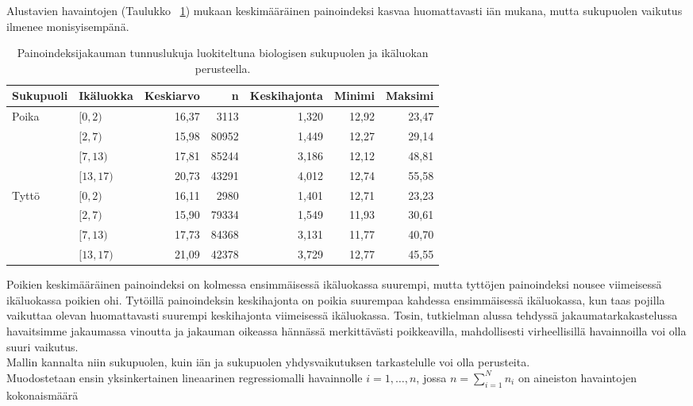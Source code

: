 \documentclass[finnish]{docopts}
\begin{document}
Alustavien havaintojen (Taulukko ~\ref{table:deskrtaulu}) mukaan keskimääräinen painoindeksi kasvaa huomattavasti iän mukana, mutta sukupuolen vaikutus ilmenee monisyisempänä.\\

\begin{table}[H]
\centering
\begin{tabular}{llrrrrr}
\toprule
Sukupuoli & Ikäluokka & Keskiarvo & n & Keskihajonta & Minimi & Maksimi\\
\midrule
Poika & $[0,2)$ & 16,37 & 3113 & 1,320 & 12,92 & 23,47\\
 & $[2,7)$ & 15,98 & 80952 & 1,449 & 12,27 & 29,14\\
 & $[7,13)$ & 17,81 & 85244 & 3,186 & 12,12 & 48,81\\
 & $[13,17)$ & 20,73 & 43291 & 4,012 & 12,74 & 55,58\\
\addlinespace
Tyttö & $[0,2)$ & 16,11 & 2980 & 1,401 & 12,71 & 23,23\\
 & $[2,7)$ & 15,90 & 79334 & 1,549 & 11,93 & 30,61\\
 & $[7,13)$ & 17,73 & 84368 & 3,131 & 11,77 & 40,70\\
 & $[13,17)$ & 21,09 & 42378 & 3,729 & 12,77 & 45,55\\
\bottomrule
\end{tabular}
\caption{Painoindeksijakauman tunnuslukuja luokiteltuna biologisen sukupuolen ja ikäluokan perusteella.}
\label{table:deskrtaulu}
\end{table}

Poikien keskimääräinen painoindeksi on kolmessa ensimmäisessä ikäluokassa suurempi, mutta tyttöjen painoindeksi nousee viimeisessä ikäluokassa poikien ohi. Tytöillä painoindeksin keskihajonta on poikia suurempaa kahdessa ensimmäisessä ikäluokassa, kun taas pojilla vaikuttaa olevan huomattavasti suurempi keskihajonta viimeisessä ikäluokassa. Tosin, tutkielman alussa tehdyssä jakaumatarkakastelussa havaitsimme jakaumassa vinoutta ja jakauman oikeassa hännässä merkittävästi poikkeavilla, mahdollisesti virheellisillä havainnoilla voi olla suuri vaikutus.\\

Mallin kannalta niin sukupuolen, kuin iän ja sukupuolen yhdysvaikutuksen tarkastelulle voi olla perusteita.\\

Muodostetaan ensin yksinkertainen lineaarinen regressiomalli havainnolle $i = 1,\dots, n$, jossa $n = \sum\limits_{i = 1}^{N} n_{i}$ on aineiston havaintojen kokonaismäärä
\end{document}
